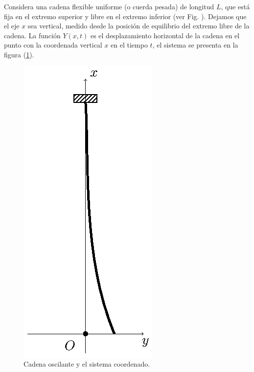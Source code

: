 Considera una cadena flexible uniforme (o cuerda pesada) de longitud $L$, que está fija en el extremo superior y libre en el extremo inferior (ver Fig. ). Dejamos que el eje $x$ sea vertical, medido desde la posición de equilibrio del extremo libre de la cadena. La función $Y (x, t)$ es el desplazamiento horizontal de la cadena en el punto con la coordenada vertical $x$ en el tiempo $t$, el sistema se presenta en la figura (\ref{fig:figura_cadena_inicial}).
\begin{figure}[H]
    \centering
    \includegraphics[scale=1]{Imagenes/Cadena_Oscilante_01.eps}
    \caption{Cadena oscilante y el sistema coordenado.}
    \label{fig:figura_cadena_inicial}
\end{figure}

